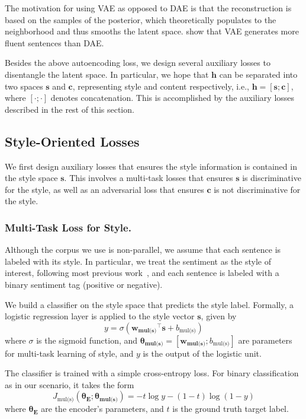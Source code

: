 \documentclass[letterpaper]{article} %
\newcommand{\loss}[1]{J_{\text{#1}}}
\newcommand{\nnweight}[1]{\bm{\theta_{\text{#1}}}}
\newcommand{\weight}[1]{\bm{w_{\text{#1}}}}
\newcommand{\bias}[1]{b_{\text{#1}}}
\newcommand{\citeay}[1]{\citeauthor{#1} \shortcite{#1}}
\begin{document}
The motivation for using VAE as opposed to DAE is  that the reconstruction is based on the samples of the posterior, which theoretically populates to the neighborhood and thus smooths the latent space. \citeay{bowman2016generating} show that VAE generates more fluent sentences than DAE.

Besides the above autoencoding loss, we design several auxiliary losses to disentangle the latent space. In particular, we hope that $\bm h$ can be separated into two spaces $\bm s$ and $\bm c$, representing style and content respectively, i.e., $\bm h = [\bm s ; \bm c]$, where $[\cdot;\cdot]$ denotes concatenation.
This is accomplished by the auxiliary losses described in the rest of this section.


\subsection{Style-Oriented Losses}

We first design auxiliary losses that ensures the style information is contained in the style space $\bm s$. This involves a multi-task losses that ensures $\bm s$ is discriminative for the style, as well as an adversarial loss that ensures $\bm c$ is not discriminative for the style.

\subsubsection{Multi-Task Loss for Style.} \label{ssec:multitask-style-objective}
Although the corpus we use is non-parallel, we assume that each sentence is labeled with its style. In particular, we treat the sentiment as the style of interest, following most previous work~\cite{hu2017toward,shen2017style,fu2017style}, and each sentence is labeled with a binary sentiment tag (positive or negative).

We build a classifier on the style space that predicts the style label. Formally, a logistic regression layer is applied to the style vector $\bm s$, given by
\begin{equation} \label{eqn:class-pred}
	y = \sigma({\weight{mul(s)}}^\top \bm s + \bias{mul(s)})
\end{equation}
where $\sigma$ is the sigmoid function, and $\nnweight{mul(s)}=[\weight{mul(s)}; \bias{mul(s)}]$ are parameters for multi-task learning of style, and $y$ is the output of the logistic unit.

The classifier is trained with a simple cross-entropy loss. For binary classification as in our scenario, it takes the form
\begin{equation} \label{eqn:style-multi-task-loss}
	\loss{mul(s)}(\nnweight{E};\nnweight{mul(s)}) =
	- t \log y- (1-t)\log (1-y)
\end{equation}
where $\nnweight{E}$ are the encoder's parameters, and $t$ is the ground truth target label.
\end{document}

